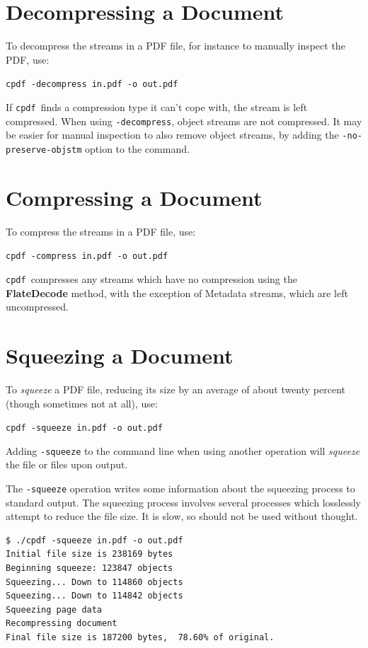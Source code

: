 \documentclass{book}
\newcommand{\cpdf}{\texttt{cpdf}}
\begin{document}
  \section{Decompressing a Document}
  To decompress the streams in a PDF file, for instance to manually inspect the
PDF, use:
  \begin{framed}
   \noindent\small\verb!cpdf -decompress in.pdf -o out.pdf!
  \end{framed}
  \noindent If \cpdf\ finds a compression type it can't cope with, the stream is left compressed. When using \texttt{-decompress}, object streams are not compressed. It may be easier for manual inspection to also remove object streams, by adding the \texttt{-no-preserve-objstm} option to the command.
  \section{Compressing a Document}
  To compress the streams in a PDF file, use:
  \begin{framed}
    \noindent\small\verb!cpdf -compress in.pdf -o out.pdf!
  \end{framed}
  \noindent\cpdf\ compresses any streams which have no compression using the
  \textbf{Flate\-Decode} method, with the exception of Metadata streams, which
  are left uncompressed.
  
  \section{Squeezing a Document}
  To \textit{squeeze} a PDF file, reducing its size by an average of about twenty percent (though sometimes not at all), use:
  \begin{framed}
    \noindent\small\verb!cpdf -squeeze in.pdf -o out.pdf!
  \end{framed}
  \noindent Adding \texttt{-squeeze} to the command line when using another operation will \textit{squeeze} the file or files upon output.
  
  The \texttt{-squeeze} operation writes some information about the squeezing process to standard output. The squeezing process involves several processes which losslessly attempt to reduce the file size. It is slow, so should not be used without thought.

\begin{verbatim}
$ ./cpdf -squeeze in.pdf -o out.pdf
Initial file size is 238169 bytes
Beginning squeeze: 123847 objects
Squeezing... Down to 114860 objects
Squeezing... Down to 114842 objects
Squeezing page data
Recompressing document
Final file size is 187200 bytes,  78.60% of original.
\end{verbatim}
\end{document}
